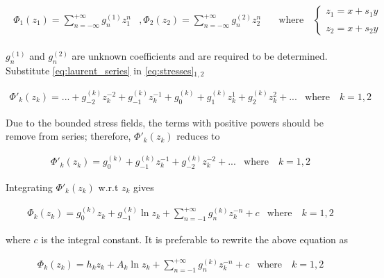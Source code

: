 \documentclass{article}
\begin{document}
\begin{align}
    \begin{matrix}
    \Phi_1(z_1) = \displaystyle\sum_{n=-\infty}^{+\infty} g_n^{(1)} z_1^n  &, 
    \Phi_2(z_2) = \displaystyle\sum_{n=-\infty}^{+\infty} g_n^{(2)} z_2^n &
    \quad \text{where} \quad 
    \left\{\begin{matrix}
    z_1 = x + s_1 y   \\ 
    \\
    z_2 = x + s_2 y
    \end{matrix}\right.
    \end{matrix}
    \label{eq:laurent_series}
\end{align}

$g_n^{(1)}$ and $g_n^{(2)}$ are unknown coefficients and are required to be determined. Substitute \cref{eq:laurent_series} in \cref{eq:stresses}$_{1,2}$

\begin{equation*}
    \begin{matrix}
    \Phi'_k(z_k) = ... + g_{-2}^{(k)} z_{k}^{-2} + g_{-1}^{(k)} z_{k}^{-1} + g_{0}^{(k)} + g_{1}^{(k)} z_{k}^{1} + g_{2}^{(k)} z_{k}^{2} + ... &
    \text{where} \quad k = 1, 2
    \end{matrix}
\end{equation*}

Due to the bounded stress fields, the terms with positive powers should be remove from series; therefore, $\Phi'_k(z_k)$ reduces to 

\begin{equation*}
    \begin{matrix}
    \Phi'_k(z_k) = g_{0}^{(k)} + g_{-1}^{(k)} z_{k}^{-1} + g_{-2}^{(k)} z_{k}^{-2} + ... &
    \text{where} \quad k = 1, 2
    \end{matrix}
\end{equation*}

Integrating $\Phi'_k(z_k)$ w.r.t $z_k$ gives

\begin{equation*}
    \begin{matrix}
    \Phi_k(z_k) = g_{0}^{(k)} z_k + g_{-1}^{(k)} \ln{z_k} + \displaystyle\sum_{n=-1}^{+\infty} g_n^{(k)} z_k^{-n} + c &
    \text{where} \quad k = 1, 2
    \end{matrix}
\end{equation*}

where $c$ is the integral constant. It is preferable to rewrite the above equation as

\begin{equation}
    \begin{matrix}
    \Phi_k(z_k) = h_k z_k + A_k \ln{z_k} + \displaystyle\sum_{n=-1}^{+\infty} g_n^{(k)} z_k^{-n} + c &
    \text{where} \quad k = 1, 2
    \end{matrix}
    \label{eq:phi_laurent}
\end{equation}
\end{document}

